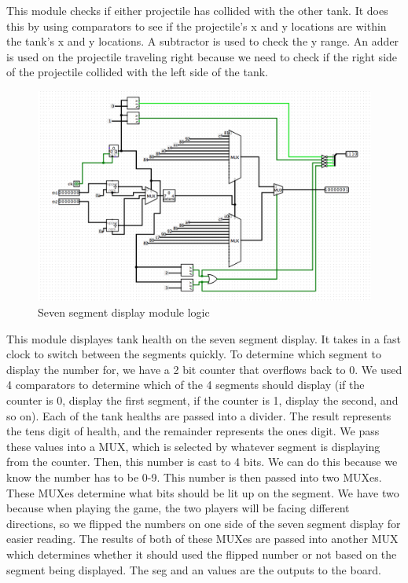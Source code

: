 \documentclass{article}
\begin{document}
This module checks if either projectile has collided with the other tank. It does this by using comparators to see if the projectile's x and y locations are within the tank's x and y locations. A subtractor is used to check the y range. An adder is used on the projectile traveling right because we need to check if the right side of the projectile collided with the left side of the tank.

\begin{figure}[H]
	\begin{center}
		\includegraphics[width=1\textwidth]{sevenseg.png} 
		\caption{Seven segment display module logic}
	\end{center}
\end{figure}

This module displayes tank health on the seven segment display. It takes in a fast clock to switch between the segments quickly. To determine which segment to display the number for, we have a 2 bit counter that overflows back to 0. We used 4 comparators to determine which of the 4 segments should display (if the counter is 0, display the first segment, if the counter is 1, display the second, and so on). Each of the tank healths are passed into a divider. The result represents the tens digit of health, and the remainder represents the ones digit. We pass these values into a MUX, which is selected by whatever segment is displaying from the counter. Then, this number is cast to 4 bits. We can do this because we know the number has to be 0-9. This number is then passed into two MUXes. These MUXes determine what bits should be lit up on the segment. We have two because when playing the game, the two players will be facing different directions, so we flipped the numbers on one side of the seven segment display for easier reading. The results of both of these MUXes are passed into another MUX which determines whether it should used the flipped number or not based on the segment being displayed. The seg and an values are the outputs to the board.
\end{document}
